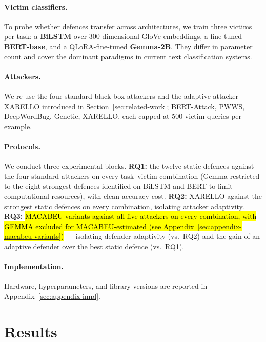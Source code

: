 \documentclass[11pt]{article}
\begin{document}
\paragraph{Victim classifiers.}
To probe whether defences transfer across architectures, we train three victims per task: a \textbf{BiLSTM} over 300-dimensional GloVe embeddings, a fine-tuned \textbf{BERT-base}, and a QLoRA-fine-tuned \textbf{Gemma-2B}. They differ in parameter count and cover the dominant paradigms in current text classification systems.

\paragraph{Attackers.}
We re-use the four standard black-box attackers and the adaptive attacker XARELLO introduced in Section~\ref{sec:related-work}; BERT-Attack, PWWS, DeepWordBug, Genetic, XARELLO, each capped at 500 victim queries per example.

\paragraph{Protocols.}
We conduct three experimental blocks. \textbf{RQ1:} the twelve static defences against the four standard attackers on every task--victim combination (Gemma restricted to the eight strongest defences identified on BiLSTM and BERT to limit computational resources), with clean-accuracy cost. \textbf{RQ2:} XARELLO against the strongest static defences on every combination, isolating attacker adaptivity. \textbf{RQ3:} \hl{MACABEU variants against all five attackers on every combination, with GEMMA excluded for MACABEU-estimated (see Appendix~\ref{sec:appendix-macabeu-variants})} --- isolating defender adaptivity (vs.\ RQ2) and the gain of an adaptive defender over the best static defence (vs.\ RQ1).


\paragraph{Implementation.}
Hardware, hyperparameters, and library versions are reported in Appendix~\ref{sec:appendix-impl}.





\section{Results}
 
\end{document}
